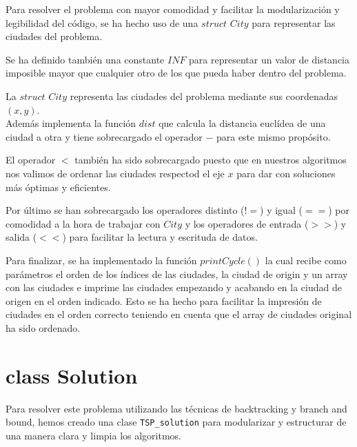 \documentclass{article}
\begin{document}
Para resolver el problema con mayor comodidad y facilitar la modularización y legibilidad del código, se ha hecho uso de una  $struct$ $City$ para representar las ciudades del problema.


Se ha definido también una constante $INF$ para representar un valor de distancia imposible mayor que cualquier otro de los que pueda haber dentro del problema.


La $struct$ $City$ representa las ciudades del problema mediante sus coordenadas $(x,y)$.\\


Además implementa la función $dist$ que calcula la distancia euclídea de una ciudad a otra y tiene sobrecargado el operador $-$ para este mismo propósito.


El operador $<$ también ha sido sobrecargado puesto que en nuestros algoritmos nos valimos de ordenar las ciudades respectod el eje $x$ para dar con soluciones más óptimas y eficientes.



Por último se han sobrecargado los operadores distinto ($!=$) y igual ($==$) por comodidad a la hora de trabajar con $City$ y los operadores de entrada ($>>$) y salida ($<<$) para facilitar la lectura y escrituda de datos.



Para finalizar, se ha implementado la función $printCycle()$ la cual recibe como parámetros el orden de los índices de las ciudades, la ciudad de origin y un array con las ciudades e imprime las ciudades empezando y acabando en la ciudad de origen en el orden indicado. Esto se ha hecho para facilitar la impresión de ciudades en el orden correcto teniendo en cuenta que el array de ciudades original ha sido ordenado.


\newpage

\section{class Solution} \label{sec:class_solution}
Para resolver este problema utilizando las técnicas de backtracking y branch and bound, hemos creado una clase \verb|TSP_solution| para modularizar y estructurar de una manera clara y limpia los algoritmos. 
\end{document}
